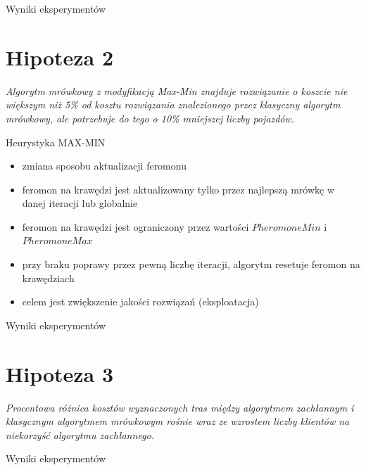 \documentclass{beamer}
\begin{document}
\begin{frame}{Wyniki eksperymentów}

\end{frame}

\section*{Hipoteza 2}

\begin{frame}
    \textit{Algorytm mrówkowy z modyfikacją Max-Min znajduje rozwiązanie o koszcie nie większym niż 5\% od kosztu rozwiązania znalezionego przez klasyczny algorytm mrówkowy, ale potrzebuje do tego o 10\% mniejszej liczby pojazdów.}
\end{frame}


\begin{frame}{Heurystyka MAX-MIN}
    \begin{itemize}
        \setlength\itemsep{1em}
        \item zmiana sposobu aktualizacji feromonu
        \item feromon na krawędzi jest aktualizowany tylko przez najlepszą mrówkę w danej iteracji lub globalnie
        \item feromon na krawędzi jest ograniczony przez wartości $PheromoneMin$ i $PheromoneMax$
        \item przy braku poprawy przez pewną liczbę iteracji, algorytm resetuje feromon na krawędziach
        \item celem jest zwiększenie jakości rozwiązań (eksploatacja)
    \end{itemize}
\end{frame}


\begin{frame}{Wyniki eksperymentów}

\end{frame}

\section*{Hipoteza 3}
\begin{frame}
    \textit{Procentowa różnica kosztów wyznaczonych tras między algorytmem zachłannym i klasycznym algorytmem mrówkowym rośnie wraz ze wzrostem liczby klientów na niekorzyść algorytmu zachłannego.}
\end{frame}


\begin{frame}{Wyniki eksperymentów}

\end{frame}
\end{document}
